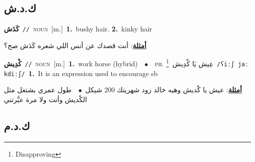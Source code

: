 \documentclass[10pt,a4paper,twoside]{article} %
\begin{document}
\begin{multicols}{2}
\vspace{-3mm}
\subsection*{\color{blue}\foreignlanguage{arabic}{ك.د.ش}\color{blue}{}} 

{\setlength\topsep{0pt}\textbf{\foreignlanguage{arabic}{كَدَش}}\ {\color{gray}\texttt{//}\color{black}}\ \textsc{noun}\ [m.]\ \textbf{1.}~bushy hair.  \textbf{2.}~kinky hair\  \begin{flushright}\color{gray}\foreignlanguage{arabic}{\textbf{\underline{\foreignlanguage{arabic}{أمثلة}}}: أنت قصدك عن أنس اللي شعره كَدَش صح؟}\end{flushright}\color{black}} \vspace{2mm}

{\setlength\topsep{0pt}\textbf{\foreignlanguage{arabic}{كْدِيش}}\ {\color{gray}\texttt{//}\color{black}}\ \textsc{noun}\ [m.]\ \textbf{1.}~work horse (hybrid)\ \ $\bullet$\ \ \textsc{ph.} \color{gray} \foreignlanguage{arabic}{عِيش يَا كْدِيش}\color{black}\ \footnote{Disapproving}\ {\color{gray}\texttt{/{\sffamily ʕiːʃ jaː kdiːʃ}/}\color{black}}\ \textbf{1.}~It is an expression used to encourage sb\  \begin{flushright}\color{gray}\foreignlanguage{arabic}{\textbf{\underline{\foreignlanguage{arabic}{أمثلة}}}: عيش يا كْديش وهيه خالد زود شهريتك 200 شيكل\ $\bullet$\ \  طول عمري بشتغل مثل الكْديش وأنت ولا مرة عبَّرتني}\end{flushright}\color{black}} \vspace{2mm}

\vspace{-3mm}
\subsection*{\color{blue}\foreignlanguage{arabic}{ك.د.م}\color{blue}{}} 


\end{multicols}
\end{document}
